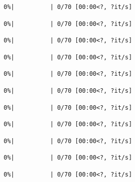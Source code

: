 \documentclass[
  english,
  letterpaper,
]{scrbook}
\begin{document}
\protect{}\label{team4-train-14}
\begin{verbatim}
  0%|          | 0/70 [00:00<?, ?it/s]
\end{verbatim}

\protect{}\label{team4-train-15}
\begin{verbatim}
  0%|          | 0/70 [00:00<?, ?it/s]
\end{verbatim}

\protect{}\label{team4-train-16}
\begin{verbatim}
  0%|          | 0/70 [00:00<?, ?it/s]
\end{verbatim}

\protect{}\label{team4-train-17}
\begin{verbatim}
  0%|          | 0/70 [00:00<?, ?it/s]
\end{verbatim}

\protect{}\label{team4-train-18}
\begin{verbatim}
  0%|          | 0/70 [00:00<?, ?it/s]
\end{verbatim}

\protect{}\label{team4-train-19}
\begin{verbatim}
  0%|          | 0/70 [00:00<?, ?it/s]
\end{verbatim}

\protect{}\label{team4-train-20}
\begin{verbatim}
  0%|          | 0/70 [00:00<?, ?it/s]
\end{verbatim}

\protect{}\label{team4-train-21}
\begin{verbatim}
  0%|          | 0/70 [00:00<?, ?it/s]
\end{verbatim}

\protect{}\label{team4-train-22}
\begin{verbatim}
  0%|          | 0/70 [00:00<?, ?it/s]
\end{verbatim}

\protect{}\label{team4-train-23}
\begin{verbatim}
  0%|          | 0/70 [00:00<?, ?it/s]
\end{verbatim}

\protect{}\label{team4-train-24}
\begin{verbatim}
  0%|          | 0/70 [00:00<?, ?it/s]
\end{verbatim}
\end{document}
